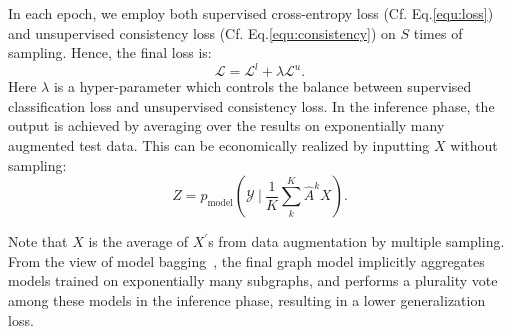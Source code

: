{{In each epoch, we employ both supervised cross-entropy loss (Cf. Eq.\ref{equ:loss}) and unsupervised consistency loss (Cf. Eq.\ref{equ:consistency}) on $S$ times of sampling. Hence, the final loss is:
\begin{equation}
\label{equ:inf}
	\mathcal{L} = \mathcal{L}^l + \lambda \mathcal{L}^u.
\end{equation}
Here $\lambda$ is a hyper-parameter which controls the balance between supervised classification loss and unsupervised consistency loss.
In the inference phase, the output is achieved by averaging  over the results on exponentially many augmented test data. This can be economically realized by inputting $X$ without sampling:
\begin{equation}
\label{equ:inference}
Z= p_{\text{model}}\left(\mathcal{Y}~\bigg|~\frac{1}{K}\sum_k^K\hat{A}^k X\right).
\end{equation}

Note that $X$ is the average of $X^{'}$s from data augmentation by multiple sampling. From the view of model bagging~\cite{breiman1996bagging}, the final graph model implicitly aggregates models trained on exponentially many subgraphs, and performs a plurality vote among these models in the inference phase, resulting in a lower generalization loss.  
}






}
